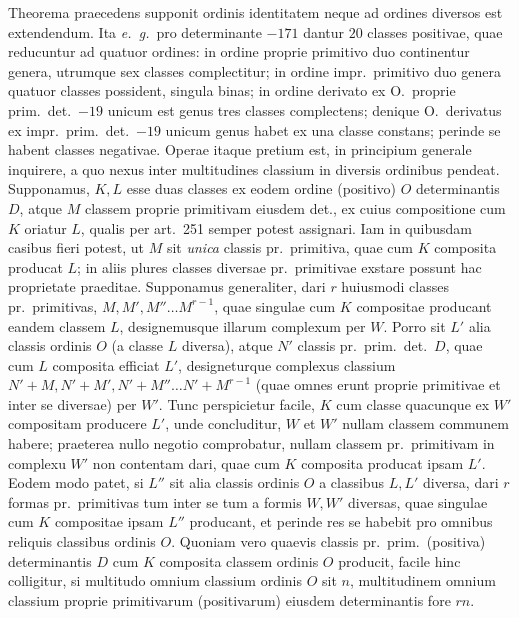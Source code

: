 Theorema praecedens supponit ordinis identitatem neque ad ordines diversos est extendendum. Ita \textit{e.~g.}\ pro determinante $-171$ dantur $20$ classes positivae, quae reducuntur ad quatuor ordines: in ordine proprie primitivo duo continentur genera, utrumque sex classes complectitur; in ordine impr.\ primitivo duo genera quatuor classes possident, singula binas; in ordine derivato ex O.\ proprie prim.\ det.\ $-19$ unicum est genus tres classes complectens; denique O.\ derivatus ex impr.\ prim.\ det.\ $-19$ unicum genus habet ex una classe constans; perinde se habent classes negativae. Operae itaque pretium est, in principium generale inquirere, a quo nexus inter multitudines classium in diversis ordinibus pendeat. Supponamus, $K,L$ esse duas classes ex eodem ordine (positivo) $O$ determinantis $D$, atque $M$ classem proprie primitivam eiusdem det., ex cuius compositione cum $K$ oriatur $L$, qualis per art.~251 semper potest assignari. Iam in quibusdam casibus fieri potest, ut $M$ sit \textit{unica} classis pr.\ primitiva, quae cum $K$ composita producat $L$; in aliis plures classes diversae pr.\ primitivae exstare possunt hac proprietate praeditae. Supponamus generaliter, dari $r$ huiusmodi classes pr.\ primitivas, $M,M',M''\ldots M^{r-1}$, quae singulae cum $K$ compositae producant eandem classem $L$, designemusque illarum complexum per $W$. Porro sit $L'$ alia classis ordinis $O$ (a classe $L$ diversa), atque $N'$ classis pr.\ prim.\ det.\ $D$, quae cum $L$ composita efficiat $L'$, designeturque complexus classium $N'+M,N'+M',N'+M''\ldots N'+M^{r-1}$ (quae omnes erunt proprie primitivae et inter se diversae) per $W'$. Tunc perspicietur facile, $K$ cum classe quacunque ex $W'$ compositam producere $L'$, unde concluditur, $W$ et $W'$ nullam classem communem habere; praeterea nullo negotio comprobatur, nullam classem pr.\ primitivam in complexu $W'$ non contentam dari, quae cum $K$ composita producat ipsam $L'$. Eodem modo patet, si $L''$ sit alia classis ordinis $O$ a classibus $L,L'$ diversa, dari $r$ formas pr.\ primitivas tum inter se tum a formis $W,W'$ diversas, quae singulae cum $K$ compositae ipsam $L''$ producant, et perinde res se habebit pro omnibus reliquis classibus ordinis $O$. Quoniam vero quaevis classis pr.\ prim.\ (positiva) determinantis $D$ cum $K$ composita classem ordinis $O$ producit, facile hinc colligitur, si multitudo omnium classium ordinis $O$ sit $n$, multitudinem omnium classium proprie primitivarum (positivarum) eiusdem determinantis fore $rn$. 
